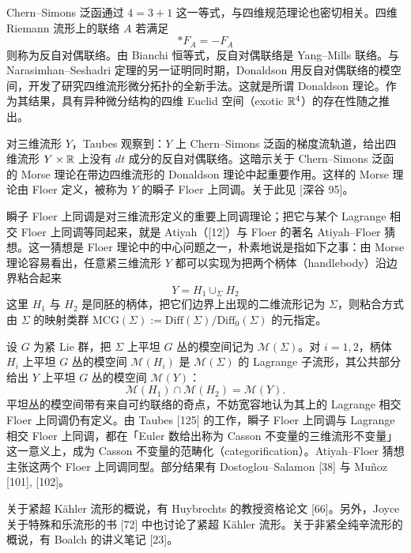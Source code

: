 Chern–Simons 泛函通过 $4=3+1$ 这一等式，与四维规范理论也密切相关。四维 Riemann 流形上的联络 $A$ 若满足
\begin{equation*}
*F_A=-F_A
\tag{20}
\end{equation*}
则称为反自对偶联络。由 Bianchi 恒等式，反自对偶联络是 Yang–Mills 联络。与 Narasimhan–Seshadri 定理的另一证明同时期，Donaldson 用反自对偶联络的模空间，开发了研究四维流形微分拓扑的全新手法。这就是所谓 Donaldson 理论。作为其结果，具有异种微分结构的四维 Euclid 空间（exotic $\mathbb{R}^4$）的存在性随之推出。

对三维流形 $Y$，Taubes 观察到：$Y$ 上 Chern–Simons 泛函的梯度流轨道，给出四维流形 $Y\times\mathbb{R}$ 上没有 $dt$ 成分的反自对偶联络。这暗示关于 Chern–Simons 泛函的 Morse 理论在带边四维流形的 Donaldson 理论中起重要作用。这样的 Morse 理论由 Floer 定义，被称为 $Y$ 的瞬子 Floer 上同调。关于此见 [深谷 95]。

瞬子 Floer 上同调是对三维流形定义的重要上同调理论；把它与某个 Lagrange 相交 Floer 上同调等同起来，就是 Atiyah（[12]）与 Floer 的著名 Atiyah–Floer 猜想。这一猜想是 Floer 理论中的中心问题之一，朴素地说是指如下之事：由 Morse 理论容易看出，任意紧三维流形 $Y$ 都可以实现为把两个柄体（handlebody）沿边界粘合起来
\begin{equation*}
Y=H_1\cup_\Sigma H_2
\tag{21}
\end{equation*}
这里 $H_1$ 与 $H_2$ 是同胚的柄体，把它们边界上出现的二维流形记为 $\Sigma$，则粘合方式由 $\Sigma$ 的映射类群 $\mathrm{MCG}(\Sigma):=\mathrm{Diff}(\Sigma)/\mathrm{Diff}_0(\Sigma)$ 的元指定。

设 $G$ 为紧 Lie 群，把 $\Sigma$ 上平坦 $G$ 丛的模空间记为 $\mathcal{M}(\Sigma)$。对 $i=1,2$，柄体 $H_i$ 上平坦 $G$ 丛的模空间 $\mathcal{M}(H_i)$ 是 $\mathcal{M}(\Sigma)$ 的 Lagrange 子流形，其公共部分给出 $Y$ 上平坦 $G$ 丛的模空间 $\mathcal{M}(Y)$：
\begin{equation*}
\mathcal{M}(H_1)\cap\mathcal{M}(H_2)=\mathcal{M}(Y).
\tag{22}
\end{equation*}
平坦丛的模空间带有来自可约联络的奇点，不妨宽容地认为其上的 Lagrange 相交 Floer 上同调仍有定义。由 Taubes [125] 的工作，瞬子 Floer 上同调与 Lagrange 相交 Floer 上同调，都在「Euler 数给出称为 Casson 不变量的三维流形不变量」这一意义上，成为 Casson 不变量的范畴化（categorification）。Atiyah–Floer 猜想主张这两个 Floer 上同调同型。部分结果有 Dostoglou–Salamon [38] 与 Muñoz [101], [102]。

关于紧超 Kähler 流形的概说，有 Huybrechts 的教授资格论文 [66]。另外，Joyce 关于特殊和乐流形的书 [72] 中也讨论了紧超 Kähler 流形。关于非紧全纯辛流形的概说，有 Boalch 的讲义笔记 [23]。

